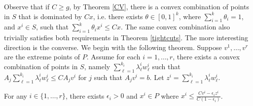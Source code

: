 Observe that if $C\geq g$, by Theorem \ref{CV}, there is a convex combination of points in $S$ that is dominated by $Cx$, i.e. there exists $\theta\in [0,1]^{k}$, where $\sum_{i=1}^{k}\theta_i=1$, and $x^i\in S$, such that $\sum_{i=1}^{k}\theta_ix^i\leq Cx$. The same convex combination also trivially satisfies both requirements in Theorem \ref{tightcuts}. The more interesting direction is the converse. We begin with the following theorem. Suppose $v^1,\ldots,v^r$ are the extreme points of $P$. Assume for each $i=1,\ldots,r$, there exists a convex combination of points in $S$, namely $\sum_{\ell=1}^{k_i} \lambda^i_\ell w^i_\ell$ such that $A_j \sum_{\ell=1}^{k_i} \lambda^i_\ell w^i_\ell \leq CA_jv^i$ for $j$ such that $A_jv^i = b$. Let $z^i = \sum_{\ell=1}^{k_i} \lambda^i_\ell w^i_\ell$.
\begin{lemma}\label{epsilon}
	For any  $i\in\{1,\ldots,r\}$, there exists $\epsilon_i >0$ and ${x^i}\in P$ where ${x^i}\leq \frac{Cv^i-\epsilon_i z^i}{C(1-\epsilon_i)}$.
\end{lemma}
